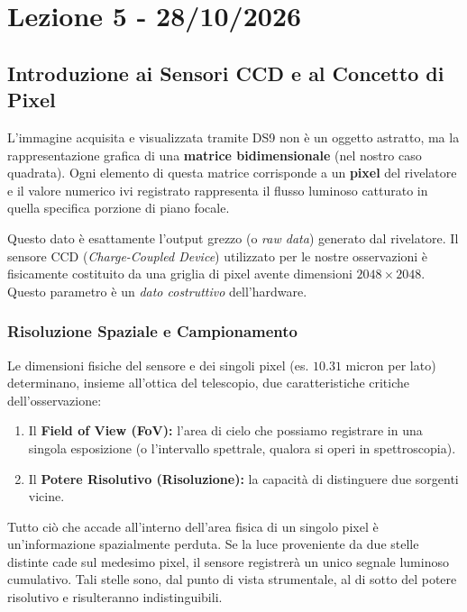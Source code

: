 \chapter{Lezione 5 - 28/10/2026}

\section{Introduzione ai Sensori CCD e al Concetto di Pixel}

L'immagine acquisita e visualizzata tramite DS9 non è un oggetto astratto, ma la rappresentazione grafica di una \textbf{matrice bidimensionale} (nel nostro caso quadrata). Ogni elemento di questa matrice corrisponde a un \textbf{pixel} del rivelatore e il valore numerico ivi registrato rappresenta il flusso luminoso catturato in quella specifica porzione di piano focale.

Questo dato è esattamente l'output grezzo (o \textit{raw data}) generato dal rivelatore. Il sensore CCD (\textit{Charge-Coupled Device}) utilizzato per le nostre osservazioni è fisicamente costituito da una griglia di pixel avente dimensioni $2048 \times 2048$.
Questo parametro è un \textit{dato costruttivo} dell'hardware.

\subsection{Risoluzione Spaziale e Campionamento}

Le dimensioni fisiche del sensore e dei singoli pixel (es. $10.31$ micron per lato) determinano, insieme all'ottica del telescopio, due caratteristiche critiche dell'osservazione:
\begin{enumerate}
\item Il \textbf{Field of View (FoV):} l'area di cielo che possiamo registrare in una singola esposizione (o l'intervallo spettrale, qualora si operi in spettroscopia).
\item Il \textbf{Potere Risolutivo (Risoluzione):} la capacità di distinguere due sorgenti vicine.
\end{enumerate}

Tutto ciò che accade all'interno dell'area fisica di un singolo pixel è un'informazione spazialmente perduta. Se la luce proveniente da due stelle distinte cade sul medesimo pixel, il sensore registrerà un unico segnale luminoso cumulativo. Tali stelle sono, dal punto di vista strumentale, al di sotto del potere risolutivo e risulteranno indistinguibili.

